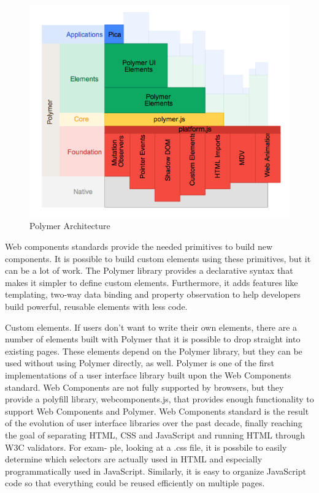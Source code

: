 \begin{figure}[htb]
 \centering
 \includegraphics[width=1.0\linewidth]{images/chapter3/polymer-architecture.png}\hfill
 \caption[Polymer Architecture]{Polymer Architecture}
 \label{fig:fourV}
\end{figure}
Web components standards provide the needed primitives to build new components. It is possible to build custom elements using these primitives, but it can be a lot of work.
The Polymer library provides a declarative syntax that makes it simpler to define custom elements. Furthermore, it adds features like templating, two-way data binding and property observation to help developers build powerful, reusable elements with less code.

Custom elements. If users don’t want to write their own elements, there are a number of elements built with Polymer that it is possible to drop straight into existing pages. These elements depend on the Polymer library, but they can be used without using Polymer directly, as well.\cite{tch_polymer1}
\newline
Polymer is one of the first implementations of a user interface library  built upon the Web Components standard. Web Components are not fully supported by browsers, but they provide a polyfill library, webcomponents.js, that provides enough functionality to support Web Components and Polymer.
\newline
Web Components standard is the result of the evolution of user interface libraries over the past decade, finally reaching the goal of separating HTML, CSS and JavaScript and running HTML through W3C validators. For exam- ple, looking at a .css file, it is possbile to easily determine which selectors are actually used in HTML and especially programmatically used in JavaScript. Similarly, it is easy to organize JavaScript code so that everything could be reused efficiently on multiple pages.\cite{tch_polymer2}
